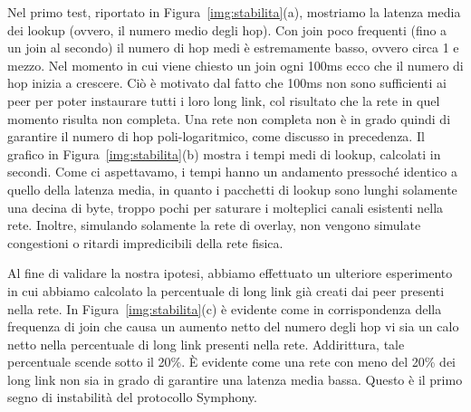 \documentclass[prodmode,acmtap]{acmlarge}
\begin{document}
Nel primo test, riportato in Figura~\ref{img:stabilita}(a), mostriamo la latenza media dei lookup (ovvero, il numero medio degli hop). Con join poco frequenti (fino a un join al secondo) il numero di hop medi è estremamente basso, ovvero circa 1 e mezzo. Nel momento in cui viene chiesto un join ogni 100ms ecco che il numero di hop inizia a crescere. Ciò è motivato dal fatto che 100ms non sono sufficienti ai peer per poter instaurare tutti i loro long link, col risultato che la rete in quel momento risulta non completa. Una rete non completa non è in grado quindi di garantire il numero di hop poli-logaritmico, come discusso in precedenza. Il grafico in Figura~\ref{img:stabilita}(b) mostra i tempi medi di lookup, calcolati in secondi. Come ci aspettavamo, i tempi hanno un andamento pressoché identico a quello della latenza media, in quanto i pacchetti di lookup sono lunghi solamente una decina di byte, troppo pochi per saturare i molteplici canali esistenti nella rete. Inoltre, simulando solamente la rete di overlay, non vengono simulate congestioni o ritardi impredicibili della rete fisica.

Al fine di validare la nostra ipotesi, abbiamo effettuato un ulteriore esperimento in cui abbiamo calcolato la percentuale di long link già creati dai peer presenti nella rete. In Figura~\ref{img:stabilita}(c) è evidente come in corrispondenza della frequenza di join che causa un aumento netto del numero degli hop vi sia un calo netto nella percentuale di long link presenti nella rete. Addirittura, tale percentuale scende sotto il 20\%. È evidente come una rete con meno del 20\% dei long link non sia in grado di garantire una latenza media bassa. Questo è il primo segno di instabilità del protocollo Symphony.
\end{document}

